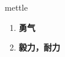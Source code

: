 
\begin{frame}
{\huge mettle}
\begin{center}
\begin{enumerate}\Large
  \item \textbf{勇气}
  \item \textbf{毅力，耐力}
\end{enumerate}
\end{center}
\end{frame}
